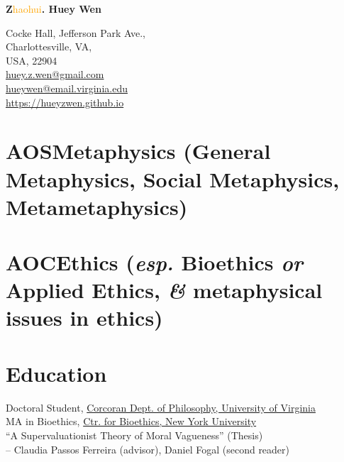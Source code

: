 \documentclass[10pt]{article}
\begin{document}
{\Huge \textbf{Z}\textcolor{orange}{haohui}\textbf{. Huey Wen}}

\bigskip

\begin{multicols}{2}
Cocke Hall, Jefferson Park Ave.,\\Charlottesville, VA,\\USA, 22904\\
\hspace*{\fill}\href{mailto:huey.z.wen@gmail.com}{huey.z.wen@gmail.com}\\
\hspace*{\fill}\href{mailto:hueywen@email.virginia.edu}{hueywen@email.virginia.edu}\\
\hspace*{\fill}\href{https://hueyzwen.github.io}{https://hueyzwen.github.io}
\end{multicols}

\section*{AOS\hspace*{\fill}\textnormal{{\normalsize Metaphysics (General Metaphysics, Social Metaphysics, Metametaphysics)}}}
\section*{AOC\hspace*{\fill}\textnormal{{\normalsize Ethics (\emph{esp.} Bioethics \emph{or} Applied Ethics, \emph{\&} metaphysical issues in ethics)}}}

\vspace{0.5cm}


\section*{Education}

\hangindent=0.8cm \quad Doctoral Student, \href{https://philosophy.virginia.edu}{Corcoran Dept. of Philosophy, University of Virginia}\hspace*{\fill}{\small Charlottesville, VA, USA}\\

\hangindent=0.8cm \quad MA in Bioethics, \href{https://wp.nyu.edu/centerforbioethics}{Ctr. for Bioethics, New York University}\hspace*{\fill}{\small New York, NY, USA}\\
``A Supervaluationist Theory of Moral Vagueness'' (Thesis)\\
-- Claudia Passos Ferreira (advisor), Daniel Fogal (second reader)\\
\end{document}
